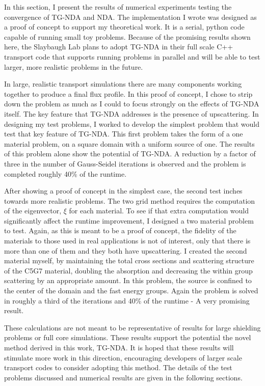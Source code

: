 
In this section, I present the results of numerical experiments testing the convergence of TG-NDA and NDA. The implementation I wrote was designed as a proof of concept to support my theoretical work. It is a serial, python code capable of running small toy problems. Because of the promising results shown here, the Slaybaugh Lab plans to adopt TG-NDA in their full scale C++ transport code that supports running problems in parallel and will be able to test larger, more realistic problems in the future.

In large, realistic transport simulations there are many components working together to produce a final flux profile. In this proof of concept, I chose to strip down the problem as much as I could to focus strongly on the effects of TG-NDA itself. The key feature that TG-NDA addresses is the presence of upscattering. In designing my test problems, I worked to develop the simplest problem that would test that key feature of TG-NDA. This first problem takes the form of a one material problem, on a square domain with a uniform source of one. The results of this problem alone show the potential of TG-NDA. A reduction by a factor of three in the number of Gauss-Seidel iterations is observed and the problem is completed roughly 40\% of the runtime. 

After showing a proof of concept in the simplest case, the second test inches towards more realistic problems. The two grid method requires the computation of the eigenvector, $\xi$ for each material. To see if that extra computation would significantly affect the runtime improvement, I designed a two material problem to test. Again, as this is meant to be a proof of concept, the fidelity of the materials to those used in real applications is not of interest, only that there is more than one of them and they both have upscattering. I created the second material myself, by maintaining the total cross sections and scattering structure of the C5G7 material, doubling the absorption and decreasing the within group scattering by an appropriate amount. In this problem, the source is confined to the center of the domain and the fast energy groups. Again the problem is solved in roughly a third of the iterations and 40\% of the runtime - A very promising result. 

These calculations are not meant to be representative of results for large shielding problems or full core simulations. These results support the potential the novel method derived in this work, TG-NDA. It is hoped that these results will stimulate more work in this direction, encouraging developers of larger scale transport codes to consider adopting this method. The details of the test problems discussed and numerical results are given in the following sections. 


